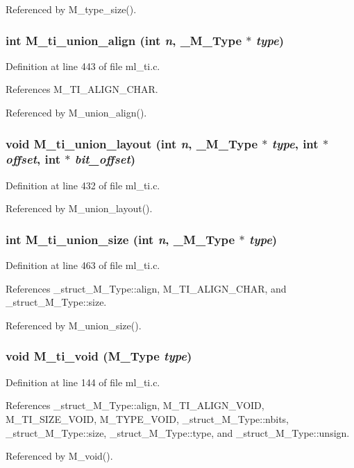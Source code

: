 Referenced by M\_\-type\_\-size().
\subsubsection{\setlength{\rightskip}{0pt plus 5cm}int M\_\-ti\_\-union\_\-align (int {\em n}, \bf{\_\-M\_\-Type} $\ast$ {\em type})}\label{m__ti_8h_ead1bc1d961b416baea9cd538b2076f3}




Definition at line 443 of file ml\_\-ti.c.

References M\_\-TI\_\-ALIGN\_\-CHAR.

Referenced by M\_\-union\_\-align().
\subsubsection{\setlength{\rightskip}{0pt plus 5cm}void M\_\-ti\_\-union\_\-layout (int {\em n}, \bf{\_\-M\_\-Type} $\ast$ {\em type}, int $\ast$ {\em offset}, int $\ast$ {\em bit\_\-offset})}\label{m__ti_8h_5fb0cb519449366a2cfe9b8d6d44d911}




Definition at line 432 of file ml\_\-ti.c.

Referenced by M\_\-union\_\-layout().
\subsubsection{\setlength{\rightskip}{0pt plus 5cm}int M\_\-ti\_\-union\_\-size (int {\em n}, \bf{\_\-M\_\-Type} $\ast$ {\em type})}\label{m__ti_8h_a0ea480b946299870b13777af2aa0777}




Definition at line 463 of file ml\_\-ti.c.

References \_\-struct\_\-M\_\-Type::align, M\_\-TI\_\-ALIGN\_\-CHAR, and \_\-struct\_\-M\_\-Type::size.

Referenced by M\_\-union\_\-size().
\subsubsection{\setlength{\rightskip}{0pt plus 5cm}void M\_\-ti\_\-void (\bf{M\_\-Type} {\em type})}\label{m__ti_8h_596f117999816a25475ec1acf46ef43f}




Definition at line 144 of file ml\_\-ti.c.

References \_\-struct\_\-M\_\-Type::align, M\_\-TI\_\-ALIGN\_\-VOID, M\_\-TI\_\-SIZE\_\-VOID, M\_\-TYPE\_\-VOID, \_\-struct\_\-M\_\-Type::nbits, \_\-struct\_\-M\_\-Type::size, \_\-struct\_\-M\_\-Type::type, and \_\-struct\_\-M\_\-Type::unsign.

Referenced by M\_\-void().